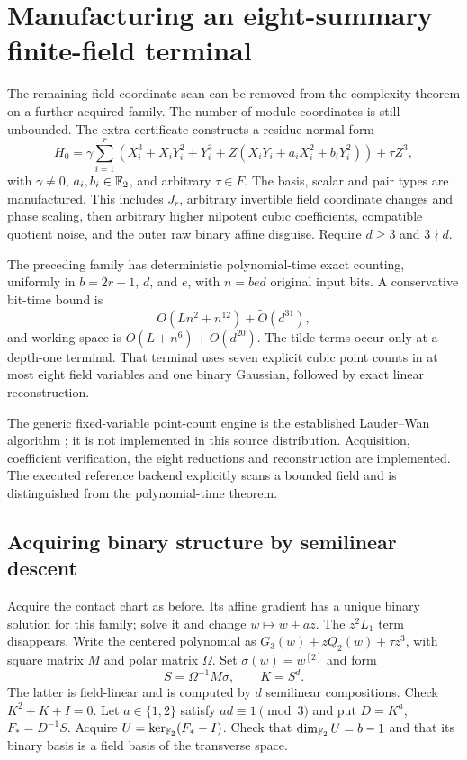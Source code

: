 \section{Manufacturing an eight-summary finite-field terminal}\label{sec:eightmoments}
The remaining field-coordinate scan can be removed from the complexity
theorem on a further acquired family. The number of module coordinates
is still unbounded. The extra certificate constructs a residue normal form
\begin{equation}\label{eq:pairnormal}
 H_0=\gamma\sum_{i=1}^r
 \left(X_i^3+X_iY_i^2+Y_i^3+
 Z(X_iY_i+a_iX_i^2+b_iY_i^2)\right)+\tau Z^3,
\end{equation}
with $\gamma\ne0$, $a_i,b_i\in\mathbb F_2$, and arbitrary $\tau\in F$.
The basis, scalar and pair types are manufactured. This includes $J_r$,
arbitrary invertible field coordinate changes and phase scaling, then
arbitrary higher nilpotent cubic coefficients, compatible quotient noise,
and the outer raw binary affine disguise. Require $d\ge3$ and $3\nmid d$.

\begin{theorem}\label{thm:eightmoments}
The preceding family has deterministic polynomial-time exact counting,
uniformly in $b=2r+1$, $d$, and $e$, with $n=bed$ original input bits.
A conservative bit-time bound is
\[
 O(Ln^2+n^{12})+\widetilde O(d^{31}),
\]
and working space is $O(L+n^6)+\widetilde O(d^{20})$.
The tilde terms occur only at a depth-one terminal. That terminal uses
seven explicit cubic point counts in at most eight field variables and
one binary Gaussian, followed by exact linear reconstruction.
\end{theorem}
The generic fixed-variable point-count engine is the established
Lauder--Wan algorithm \cite{lauderwan}; it is not implemented in this
source distribution. Acquisition, coefficient verification, the eight
reductions and reconstruction are implemented. The executed reference
backend explicitly scans a bounded field and is distinguished from the
polynomial-time theorem.

\subsection{Acquiring binary structure by semilinear descent}
Acquire the contact chart as before. Its affine gradient has a unique
binary solution for this family; solve it and change $w\mapsto w+az$.
The $z^2L_1$ term disappears. Write the centered polynomial as
$G_3(w)+zQ_2(w)+\tau z^3$, with square matrix $M$ and polar matrix
$\Omega$. Set $\sigma(w)=w^{[2]}$ and form
\[
 S=\Omega^{-1}M\sigma,\qquad K=S^d.
\]
The latter is field-linear and is computed by $d$ semilinear compositions.
Check $K^2+K+I=0$. Let $a\in\{1,2\}$ satisfy $ad\equiv1\pmod3$ and
put $D=K^a$, $F_*=D^{-1}S$. Acquire
$U=\ker_{\mathbb F_2}(F_*-I)$. Check that $\dim_{\mathbb F_2}U=b-1$ and that its
binary basis is a field basis of the transverse space.

